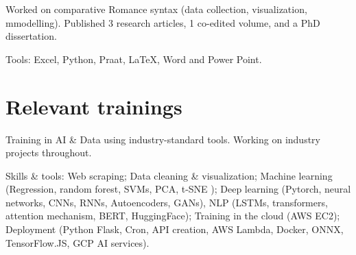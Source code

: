 \documentclass[]{plushcv}
\begin{document}
\begin{minipage}[t]{0.70\textwidth}
Worked on comparative Romance syntax (data collection, visualization, mmodelling). Published 3 research articles, 1 co-edited volume, and a PhD dissertation.
\vspace*{1mm}
\begin{tightemize}
\item Tools: Excel, Python, Praat, LaTeX, Word and Power Point.
\end{tightemize}



\vspace*{-2mm}
\section{Relevant trainings}

Training in AI \& Data using industry-standard tools. Working on industry projects throughout.
\vspace*{1mm}
\begin{tightemize}
\item Skills \& tools: Web scraping; Data cleaning \& visualization; Machine learning (Regression, random forest, SVMs, PCA, t-SNE ); Deep learning (Pytorch, neural networks, CNNs, RNNs, Autoencoders, GANs), NLP (LSTMs, transformers, attention mechanism, BERT, HuggingFace); Training in the cloud (AWS EC2); Deployment (Python Flask, Cron, API creation, AWS Lambda, Docker, ONNX, TensorFlow.JS, GCP AI services).
\end{tightemize}
\sectionsep


\vspace*{-2mm}

\end{minipage}
\end{document}

